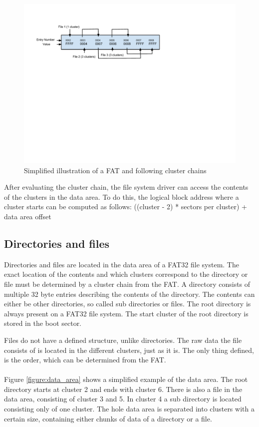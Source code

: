 \begin{figure}[h!]
\caption{Simplified illustration of a FAT and following cluster chains}
\centering
\includegraphics{figures/cluster_chain}
\end{figure}

After evaluating the cluster chain, the file system driver can access the contents of the clusters in the data area. To do this, the logical block address where a cluster starts can be computed as follows: ((cluster - 2) * sectors per cluster) + data area offset

\subsection{Directories and files}

Directories and files are located in the data area of a FAT32 file system. The exact location of the contents and which clusters correspond to the directory or file must be determined by a cluster chain from the FAT. A directory consists of multiple 32 byte entries describing the contents of the directory. The contents can either be other directories, so called sub directories or files. The root directory is always present on a FAT32 file system. The start cluster of the root directory is stored in the boot sector.

Files do not have a defined structure, unlike directories. The raw data the file consists of is located in the different clusters, just as it is. The only thing defined, is the order, which can be determined from the FAT.
\\\\
Figure \ref{figure:data_area} shows a simplified example of the data area. The root directory starts at cluster 2 and ends with cluster 6. There is also a file in the data area, consisting of cluster 3 and 5. In cluster 4 a sub directory is located consisting only of one cluster. The hole data area is separated into clusters with a certain size, containing either chunks of data of a directory or a file.

